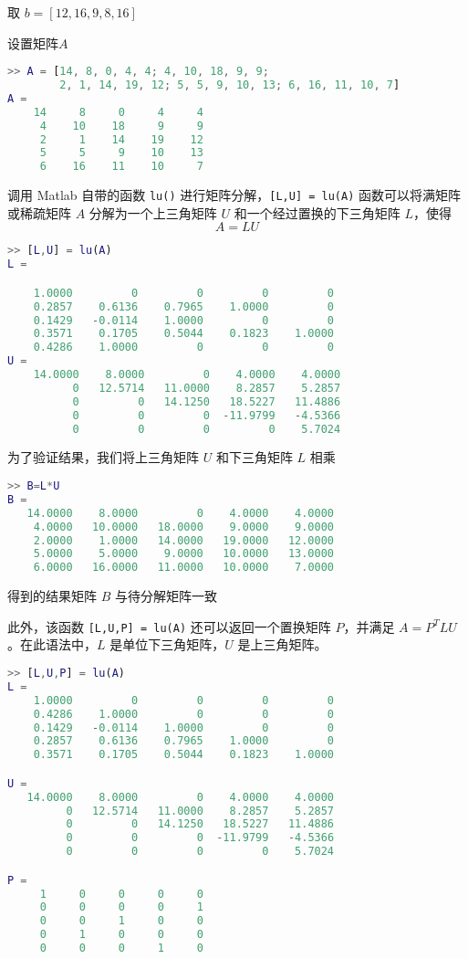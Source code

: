 取 $b=[12,16,9,8,16]$

设置矩阵$A$
\begin{lstlisting}[language=Matlab]  
>> A = [14, 8, 0, 4, 4; 4, 10, 18, 9, 9;
        2, 1, 14, 19, 12; 5, 5, 9, 10, 13; 6, 16, 11, 10, 7]
A =
    14     8     0     4     4
     4    10    18     9     9
     2     1    14    19    12
     5     5     9    10    13
     6    16    11    10     7
\end{lstlisting}

调用 Matlab 自带的函数 \lstinline|lu()| 进行矩阵分解，\lstinline|[L,U] = lu(A)| 函数可以将满矩阵或稀疏矩阵 $A$ 分解为一个上三角矩阵 $U$ 和一个经过置换的下三角矩阵 $L$，使得
\begin{equation}
    A = LU
\end{equation}

\begin{lstlisting}[language=Matlab]  
>> [L,U] = lu(A)
L =

    1.0000         0         0         0         0
    0.2857    0.6136    0.7965    1.0000         0
    0.1429   -0.0114    1.0000         0         0
    0.3571    0.1705    0.5044    0.1823    1.0000
    0.4286    1.0000         0         0         0
U =
    14.0000    8.0000         0    4.0000    4.0000
          0   12.5714   11.0000    8.2857    5.2857
          0         0   14.1250   18.5227   11.4886
          0         0         0  -11.9799   -4.5366
          0         0         0         0    5.7024
\end{lstlisting}

为了验证结果，我们将上三角矩阵 $U$ 和下三角矩阵 $L$ 相乘
\begin{lstlisting}[language=Matlab]  
>> B=L*U
B =
   14.0000    8.0000         0    4.0000    4.0000
    4.0000   10.0000   18.0000    9.0000    9.0000
    2.0000    1.0000   14.0000   19.0000   12.0000
    5.0000    5.0000    9.0000   10.0000   13.0000
    6.0000   16.0000   11.0000   10.0000    7.0000
\end{lstlisting}
得到的结果矩阵 $B$ 与待分解矩阵一致


此外，该函数 \lstinline|[L,U,P] = lu(A)| 还可以返回一个置换矩阵 $P$，并满足 $A = P^TLU$。在此语法中，$L$ 是单位下三角矩阵，$U$ 是上三角矩阵。
\begin{lstlisting}[language=Matlab]  
>> [L,U,P] = lu(A)
L =
    1.0000         0         0         0         0
    0.4286    1.0000         0         0         0
    0.1429   -0.0114    1.0000         0         0
    0.2857    0.6136    0.7965    1.0000         0
    0.3571    0.1705    0.5044    0.1823    1.0000

U =
   14.0000    8.0000         0    4.0000    4.0000
         0   12.5714   11.0000    8.2857    5.2857
         0         0   14.1250   18.5227   11.4886
         0         0         0  -11.9799   -4.5366
         0         0         0         0    5.7024

P =
     1     0     0     0     0
     0     0     0     0     1
     0     0     1     0     0
     0     1     0     0     0
     0     0     0     1     0
\end{lstlisting}

